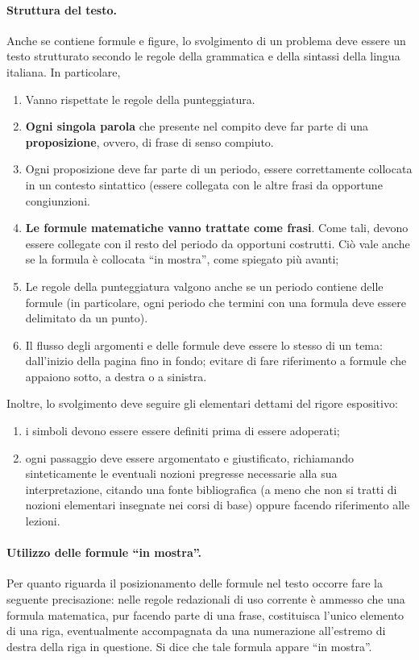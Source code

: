 \documentclass[12pt]{article}
\begin{document}
\paragraph{Struttura del testo.}
Anche se contiene formule e figure, lo svolgimento di un problema deve essere un testo strutturato secondo le regole della grammatica e della sintassi della lingua italiana. In particolare, 
\begin{enumerate}
  \item \label{punteggiatura} Vanno rispettate le regole della punteggiatura.
\item {\bf Ogni singola parola} che presente nel compito deve far parte di una {\bf proposizione}, ovvero, di frase di senso compiuto.
\item Ogni proposizione deve far parte di un periodo, essere correttamente collocata in un contesto sintattico (essere collegata con le altre frasi da opportune congiunzioni.
\item  {\bf Le formule matematiche vanno trattate come frasi}. Come tali, devono essere collegate con il resto del periodo da opportuni costrutti. Ci\`o vale anche se la formula \`e collocata ``in mostra'', come spiegato pi\`u avanti;
\item Le regole della punteggiatura valgono anche se un periodo contiene delle formule (in particolare, ogni periodo che termini con una formula deve essere delimitato da un punto).
\item Il flusso degli argomenti e delle formule deve essere lo stesso di un tema: dall'inizio della pagina fino in fondo; evitare di fare riferimento a formule che appaiono sotto, a destra o a sinistra.
\end{enumerate}

Inoltre, lo svolgimento deve seguire gli elementari dettami del rigore espositivo:\
\begin{enumerate}[resume]
\item \label{pippo} i simboli devono essere essere definiti prima di essere adoperati;
\item ogni passaggio deve essere argomentato e giustificato, richiamando sinteticamente le eventuali nozioni pregresse necessarie alla sua interpretazione, citando una fonte bibliografica (a meno che non si tratti di nozioni elementari insegnate nei corsi di base) oppure facendo riferimento alle lezioni.
\end{enumerate}

\paragraph{Utilizzo delle formule ``in mostra''.} Per quanto riguarda il posizionamento delle formule nel testo occorre fare la seguente precisazione: nelle regole redazionali di uso corrente \`e ammesso che una formula matematica, pur facendo parte di una frase, costituisca l'unico elemento di una riga, eventualmente accompagnata da una numerazione all'estremo di destra della riga in questione. Si dice che tale formula appare ``in mostra''. 
\end{document}
